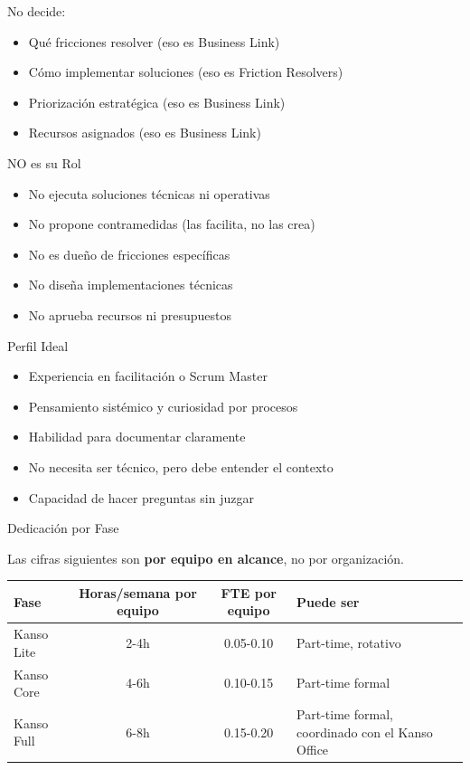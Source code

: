 No decide:
\begin{itemize}
    \item Qué fricciones resolver (eso es Business Link)
    \item Cómo implementar soluciones (eso es Friction Resolvers)
    \item Priorización estratégica (eso es Business Link)
    \item Recursos asignados (eso es Business Link)
\end{itemize}

NO es su Rol
\begin{itemize}
    \item No ejecuta soluciones técnicas ni operativas
    \item No propone contramedidas (las facilita, no las crea)
    \item No es dueño de fricciones específicas
    \item No diseña implementaciones técnicas
    \item No aprueba recursos ni presupuestos
\end{itemize}

Perfil Ideal
\begin{itemize}
    \item Experiencia en facilitación o Scrum Master
    \item Pensamiento sistémico y curiosidad por procesos
    \item Habilidad para documentar claramente
    \item No necesita ser técnico, pero debe entender el contexto
    \item Capacidad de hacer preguntas sin juzgar
\end{itemize}

Dedicación por Fase

Las cifras siguientes son \textbf{por equipo en alcance}, no por organización.

\begin{center}
\small
\begin{tabular}{|l|c|c|p{4.5cm}|}
\hline
\textbf{Fase} & \textbf{Horas/semana por equipo} & \textbf{FTE por equipo} & \textbf{Puede ser} \\ \hline
Kanso Lite & 2-4h & 0.05-0.10 & Part-time, rotativo \\ \hline
Kanso Core & 4-6h & 0.10-0.15 & Part-time formal \\ \hline
Kanso Full & 6-8h & 0.15-0.20 & Part-time formal, coordinado con el Kanso Office \\ \hline
\end{tabular}
\end{center}


